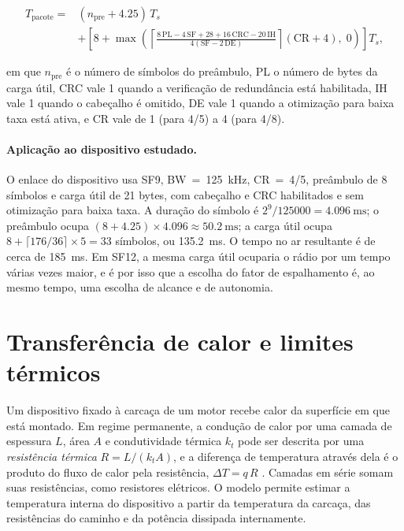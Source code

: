 \begin{equation}
\begin{split}
T_{\mathrm{pacote}} = {} & (n_{\mathrm{pre}} + \num{4,25})\,T_s \\
& + \left[ 8 + \max\!\left( \left\lceil \frac{8\,\mathrm{PL} - 4\,\mathrm{SF} + 28 + 16\,\mathrm{CRC} - 20\,\mathrm{IH}}{4(\mathrm{SF} - 2\,\mathrm{DE})} \right\rceil (\mathrm{CR} + 4),\; 0 \right) \right] T_s,
\end{split}
\label{eq:fund-toa}
\end{equation}

\noindent
em que $n_{\mathrm{pre}}$ é o número de símbolos do preâmbulo, PL o número de bytes da carga
útil, CRC vale 1 quando a verificação de redundância está habilitada, IH vale 1 quando o
cabeçalho é omitido, DE vale 1 quando a otimização para baixa taxa está ativa, e CR vale de
1 (para 4/5) a 4 (para 4/8).

\paragraph{Aplicação ao dispositivo estudado.} O enlace do dispositivo usa SF9,
BW~=~\SI{125}{\kilo\hertz}, CR~=~4/5, preâmbulo de 8 símbolos e carga útil de \num{21}
bytes, com cabeçalho e CRC habilitados e sem otimização para baixa taxa. A duração do
símbolo é $2^9/\num{125000} = \SI{4,096}{\milli\second}$; o preâmbulo ocupa
$(8 + \num{4,25}) \times \num{4,096} \approx \SI{50,2}{\milli\second}$; a carga útil ocupa
$8 + \lceil 176/36 \rceil \times 5 = 33$ símbolos, ou \SI{135,2}{\milli\second}. O tempo
no ar resultante é de cerca de \SI{185}{\milli\second}. Em SF12, a mesma carga útil
ocuparia o rádio por um tempo várias vezes maior, e é por isso que a escolha do fator de
espalhamento é, ao mesmo tempo, uma escolha de alcance e de autonomia.

\section{Transferência de calor e limites térmicos}
\label{sec:fund-termica}

Um dispositivo fixado à carcaça de um motor recebe calor da superfície em que está montado.
Em regime permanente, a condução de calor por uma camada de espessura $L$, área $A$ e
condutividade térmica $k_t$ pode ser descrita por uma \emph{resistência térmica}
$R = L/(k_t A)$, e a diferença de temperatura através dela é o produto do fluxo de calor
pela resistência, $\Delta T = q\,R$ \cite{bergman2011}. Camadas em série somam suas
resistências, como resistores elétricos. O modelo permite estimar a temperatura interna do
dispositivo a partir da temperatura da carcaça, das resistências do caminho e da potência
dissipada internamente.

